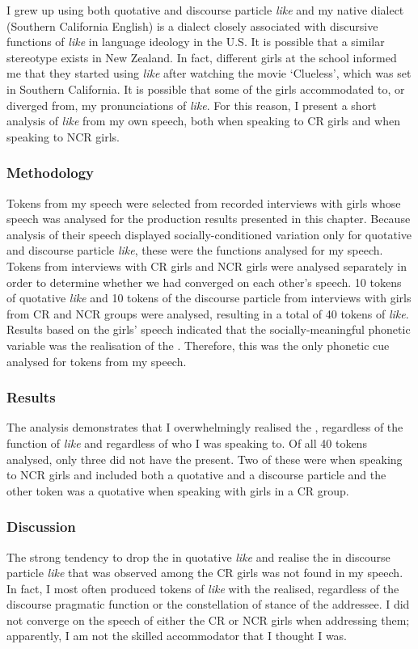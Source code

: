 I grew up using both quotative and discourse particle \textit{like} and my native dialect (Southern California English) is a dialect closely associated with discursive functions of \textit{like} in language ideology in the U.S. It is possible that a similar stereotype exists in New Zealand. In fact, different girls at the school informed me that they started using \textit{like} after watching the movie `Clueless', which was set in Southern California. It is possible that some of the girls accommodated to, or diverged from, my pronunciations of \textit{like}. For this reason, I present a short analysis of \textit{like} from my own speech, both when speaking to CR girls and when speaking to NCR girls.

\subsubsection{Methodology}
Tokens from my speech were selected from recorded interviews with girls whose speech was analysed for the production results presented in this chapter. Because analysis of their speech displayed socially-conditioned variation only for quotative and discourse particle \textit{like}, these were the functions analysed for my speech. Tokens from interviews with CR girls and NCR girls were analysed separately in order to determine whether we had converged on each other's speech. 10 tokens of quotative \textit{like} and 10 tokens of the discourse particle from interviews with girls from CR and NCR groups were analysed, resulting in a total of 40 tokens of \textit{like}. Results based on the girls' speech indicated that the socially-meaningful phonetic variable was the realisation of the . Therefore, this was the only phonetic cue analysed for tokens from my speech.

\subsubsection{Results}
The analysis demonstrates that I overwhelmingly realised the , regardless of the function of \textit{like} and regardless of who I was speaking to. Of all 40 tokens analysed, only three did not have the  present. Two of these were when speaking to NCR girls and included both a quotative and a discourse particle and the other token was a quotative when speaking with girls in a CR group. 

\subsubsection{Discussion}
The strong tendency to drop the  in quotative \textit{like} and realise the  in discourse particle \textit{like} that was observed among the CR girls was not found in my speech. In fact, I most often produced tokens of \textit{like} with the  realised, regardless of the discourse pragmatic function or the constellation of stance of the addressee. I did not converge on the speech of either the CR or NCR girls when addressing them; apparently, I am not the skilled accommodator that I thought I was. 



